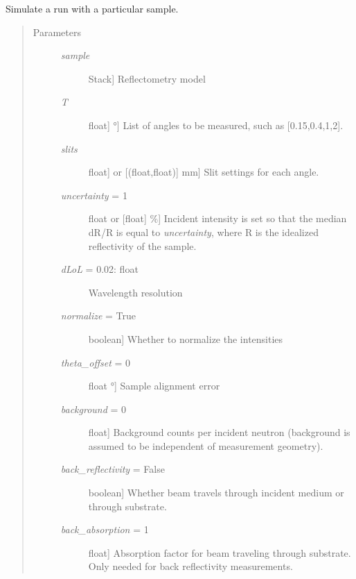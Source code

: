 \documentclass[letterpaper,10pt,english]{sphinxmanual}
\begin{document}
\begin{fulllineitems}
\begin{fulllineitems}
\end{fulllineitems}


\begin{fulllineitems}
\label{api/instrument:refl1d.instrument.Pulsed.simulate}
Simulate a run with a particular sample.
\begin{quote}\begin{description}
\item[{Parameters }] \leavevmode\begin{description}
\item[{\emph{sample}}] \leavevmode{[}Stack{]}
Reflectometry model

\item[{\emph{T}}] \leavevmode{[}{[}float{]} \textbar{} °{]}
List of angles to be measured, such as {[}0.15,0.4,1,2{]}.

\item[{\emph{slits}}] \leavevmode{[}{[}float{]} or {[}(float,float){]} \textbar{} mm{]}
Slit settings for each angle.

\item[{\emph{uncertainty} = 1}] \leavevmode{[}float or {[}float{]} \textbar{} \%{]}
Incident intensity is set so that the median dR/R is equal
to \emph{uncertainty}, where R is the idealized reflectivity
of the sample.

\item[{\emph{dLoL} = 0.02: float}] \leavevmode
Wavelength resolution

\item[{\emph{normalize} = True}] \leavevmode{[}boolean{]}
Whether to normalize the intensities

\item[{\emph{theta\_offset} = 0}] \leavevmode{[}float \textbar{} °{]}
Sample alignment error

\item[{\emph{background} = 0}] \leavevmode{[}float{]}
Background counts per incident neutron (background is
assumed to be independent of measurement geometry).

\item[{\emph{back\_reflectivity} = False}] \leavevmode{[}boolean{]}
Whether beam travels through incident medium
or through substrate.

\item[{\emph{back\_absorption} = 1}] \leavevmode{[}float{]}
Absorption factor for beam traveling through substrate.
Only needed for back reflectivity measurements.

\end{description}

\end{description}\end{quote}

\end{fulllineitems}


\end{fulllineitems}
\end{document}
